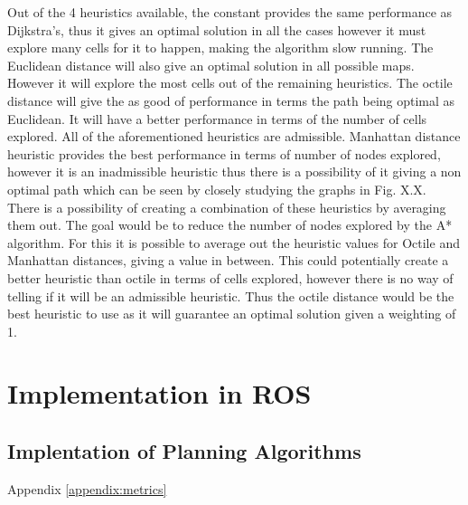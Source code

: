 \documentclass[a4paper,12pt]{article}
\begin{document}
				Out of the 4 heuristics available, the constant provides the same performance as Dijkstra’s, thus it gives an optimal solution in all the cases however it must explore many cells for it to happen, making the algorithm slow running. The Euclidean distance will also give an optimal solution in all possible maps. However it will explore the most cells out of the remaining heuristics. The octile distance will give the as good of performance in terms the path being optimal as Euclidean. It will have a better performance in terms of the number of cells explored. All of the aforementioned heuristics are admissible. Manhattan distance heuristic provides the best performance in terms of number of nodes explored, however it is an inadmissible heuristic thus there is a possibility of it giving a non optimal path which can be seen by closely studying the graphs in Fig. X.X.
				\\
				There is a possibility of creating a combination of these heuristics by averaging them out. The goal would be to reduce the number of nodes explored by the A* algorithm. For this it is possible to average out the heuristic values for Octile and Manhattan distances, giving a value in between. This could potentially create a better heuristic than octile in terms of cells explored, however there is no way of telling if it will be an admissible heuristic. Thus the octile distance would be the best heuristic to use as it will guarantee an optimal solution given a weighting of 1. 

	\section{Implementation in ROS}
	
		\subsection{Implentation of Planning Algorithms}
		Appendix \ref{appendix:metrics} 
\end{document}
